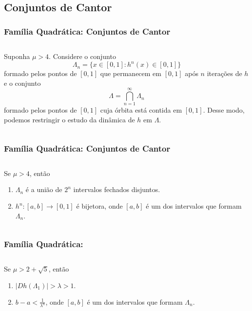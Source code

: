 \subsection{Conjuntos de Cantor}

\begin{frame}
\vspace{5pt}
\frametitle{Família Quadrática: Conjuntos de Cantor}
\begin{columns}
\column{\dimexpr\paperwidth-15pt}

Suponha $\mu > 4$. Considere o conjunto
$$\Lambda_n = \lbrace x \in [0, 1] : h^n(x) \in [0, 1] \rbrace$$ formado pelos pontos de $[0, 1]$ que permanecem em $[0, 1]$ após $n$ iterações de $h$ e o conjunto
$$\Lambda =  \bigcap_{n = 1}^\infty \Lambda_n$$
formado pelos pontos de $[0, 1]$ cuja órbita está contida em $[0, 1]$. Desse modo, podemos restringir o estudo da dinâmica de $h$ em $\Lambda$.

\end{columns}
\end{frame}


\begin{frame}
\vspace{5pt}
\frametitle{Família Quadrática: Conjuntos de Cantor}
\begin{columns}
\column{\dimexpr\paperwidth-15pt}

\begin{proposition}
Se $\mu > 4$, então
\begin{enumerate}
\item $\Lambda_n$ é a união de $2^n$ intervalos fechados disjuntos.
\item $h^n: [a, b] \to [0, 1]$ é bijetora, onde $[a, b]$ é um dos intervalos que formam $\Lambda_n$.
\end{enumerate}
\end{proposition}

\end{columns}
\end{frame}


\begin{frame}
\vspace{5pt}
\frametitle{Família Quadrática: \subsecname}
\begin{columns}
\column{\dimexpr\paperwidth-15pt}

\begin{lemma}
Se $\mu > 2 + \sqrt{5}$, então
\begin{enumerate}
\item  $|D h(\Lambda_1)| > \lambda > 1$.
\item $b - a < \frac{1}{\lambda^n}$, onde $[a, b]$ é um dos intervalos que formam $\Lambda_n$.
\end{enumerate}
\end{lemma}

\end{columns}
\end{frame}

